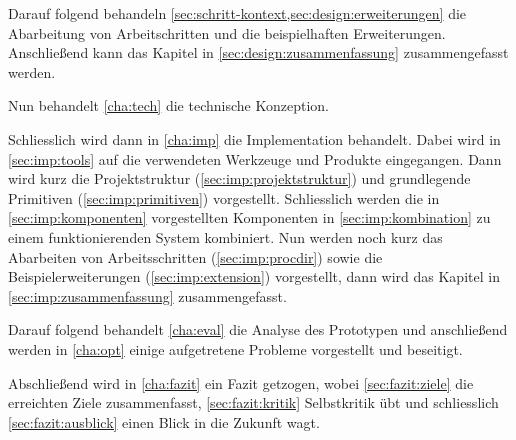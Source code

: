 Darauf folgend behandeln \cref{sec:schritt-kontext,sec:design:erweiterungen} die Abarbeitung von Arbeitschritten und die beispielhaften Erweiterungen.
Anschließend kann das Kapitel in \cref{sec:design:zusammenfassung} zusammengefasst werden.

Nun behandelt \cref{cha:tech} die technische Konzeption.


Schliesslich wird dann in \cref{cha:imp} die Implementation behandelt.
Dabei wird in \cref{sec:imp:tools} auf die verwendeten Werkzeuge und Produkte eingegangen. Dann wird kurz die Projektstruktur (\cref{sec:imp:projektstruktur}) und grundlegende Primitiven (\cref{sec:imp:primitiven}) vorgestellt.
Schliesslich werden die in \cref{sec:imp:komponenten} vorgestellten Komponenten in \cref{sec:imp:kombination} zu einem funktionierenden System kombiniert.
Nun werden noch kurz das Abarbeiten von Arbeitsschritten (\cref{sec:imp:procdir}) sowie die Beispielerweiterungen (\cref{sec:imp:extension}) vorgestellt,
dann wird das Kapitel in \cref{sec:imp:zusammenfassung} zusammengefasst.

Darauf folgend behandelt \cref{cha:eval} die Analyse des Prototypen und anschließend werden in \cref{cha:opt} einige aufgetretene Probleme vorgestellt und beseitigt.

Abschließend wird in \cref{cha:fazit} ein Fazit getzogen,
wobei \cref{sec:fazit:ziele} die erreichten Ziele zusammenfasst,
\cref{sec:fazit:kritik} Selbstkritik übt und schliesslich \cref{sec:fazit:ausblick} einen Blick in die Zukunft wagt.

